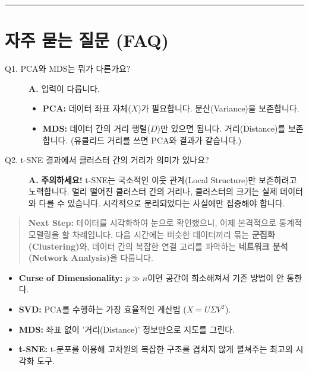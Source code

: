\documentclass[11pt,a4paper]{book}
\theoremstyle{definition}
\begin{document}
\vspace{0.5cm}\hrule\vspace{0.5cm}

\section{자주 묻는 질문 (FAQ)}

\begin{description}
    \item[Q1. PCA와 MDS는 뭐가 다른가요?]
    \textbf{A.} 입력이 다릅니다.
    \begin{itemize}
        \item \textbf{PCA:} 데이터 좌표 자체($X$)가 필요합니다. 분산(Variance)을 보존합니다.
        \item \textbf{MDS:} 데이터 간의 거리 행렬($D$)만 있으면 됩니다. 거리(Distance)를 보존합니다. (유클리드 거리를 쓰면 PCA와 결과가 같습니다.)
    \end{itemize}
    
    \item[Q2. t-SNE 결과에서 클러스터 간의 거리가 의미가 있나요?]
    \textbf{A.} \textbf{주의하세요!} t-SNE는 국소적인 이웃 관계(Local Structure)만 보존하려고 노력합니다. 멀리 떨어진 클러스터 간의 거리나, 클러스터의 크기는 실제 데이터와 다를 수 있습니다. 시각적으로 분리되었다는 사실에만 집중해야 합니다.
\end{description}

\vspace{1cm}
\begin{quote}
\textbf{Next Step:} 데이터를 시각화하여 눈으로 확인했으니, 이제 본격적으로 통계적 모델링을 할 차례입니다. 다음 시간에는 비슷한 데이터끼리 묶는 \textbf{군집화(Clustering)}와, 데이터 간의 복잡한 연결 고리를 파악하는 \textbf{네트워크 분석(Network Analysis)}을 다룹니다.
\end{quote}

\begin{summarybox}[title={Module 1 핵심 요약}]
\begin{itemize}
    \item \textbf{Curse of Dimensionality:} $p \gg n$이면 공간이 희소해져서 기존 방법이 안 통한다.
    \item \textbf{SVD:} PCA를 수행하는 가장 효율적인 계산법 ($X = U \Sigma V^T$).
    \item \textbf{MDS:} 좌표 없이 '거리(Distance)' 정보만으로 지도를 그린다.
    \item \textbf{t-SNE:} t-분포를 이용해 고차원의 복잡한 구조를 겹치지 않게 펼쳐주는 최고의 시각화 도구.
\end{itemize}
\end{summarybox}
\end{document}
